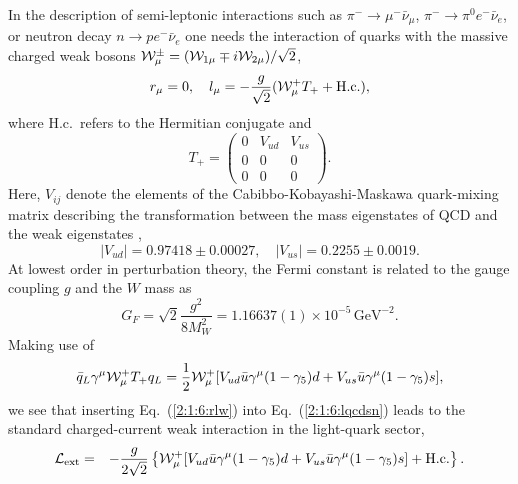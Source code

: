 \documentclass[twoside,12pt]{article}
\begin{document}
   In the description of semi-leptonic interactions such as
$\pi^-\to \mu^-\bar{\nu}_\mu$,  $\pi^-\to\pi^0e^-\bar{\nu}_e$, or
neutron decay $n\to p e^-\bar{\nu}_e$ one needs the interaction of quarks with
the massive charged weak bosons
${\cal W}^\pm_\mu=({\cal W}_{1\mu}\mp i {\cal W}_{2\mu})/\sqrt{2}$,
\begin{equation}
\label{2:1:6:rlw} r_\mu=0,\quad l_\mu=-\frac{g}{\sqrt{2}} ({\cal W}^+_\mu T_+ +
\mbox{H.c.}),
\end{equation}
where H.c.~refers to the Hermitian conjugate and
$$
T_+=\left(\begin{array}{rrr}0&V_{ud}&V_{us}\\0&0&0\\0&0&0\end{array}\right).
$$
   Here, $V_{ij}$ denote the elements of the
Cabibbo-Kobayashi-Maskawa quark-mixing matrix describing the
transformation between the mass eigenstates of QCD and the weak
eigenstates \cite{PDG_2008},
$$|V_{ud}|=0.97418\pm 0.00027,\quad
|V_{us}|=0.2255\pm 0.0019.
$$
   At lowest order in perturbation theory, the Fermi constant is related
to the gauge coupling $g$ and the $W$ mass as
\begin{equation}
\label{2:1:6:GF}
G_F=\sqrt{2} \frac{g^2}{8 M^2_W}=1.16637(1)\times 10^{-5}\,\mbox{GeV}^{-2}.
\end{equation}
   Making use of
\begin{displaymath}
\bar{q}_L\gamma^\mu {\cal W}_\mu^+ T_+ q_L
=\frac{1}{2}{\cal W}_\mu^+[V_{ud}\bar{u}\gamma^\mu(1-\gamma_5)d
+V_{us}\bar{u}\gamma^\mu(1-\gamma_5)s],
\end{displaymath}
   we see that inserting Eq.\ (\ref{2:1:6:rlw}) into Eq.\ (\ref{2:1:6:lqcdsn})
leads to the standard charged-current weak interaction in the light-quark sector,
\begin{eqnarray*}
{\cal L}_{\rm ext}&=&-\frac{g}{2\sqrt{2}}\left\{{\cal W}^+_\mu[
V_{ud}\bar{u}\gamma^\mu(1-\gamma_5)d+V_{us}\bar{u}\gamma^\mu(1-\gamma_5)s]
+\mbox{H.c.}\right\}.
\end{eqnarray*}
\end{document}
